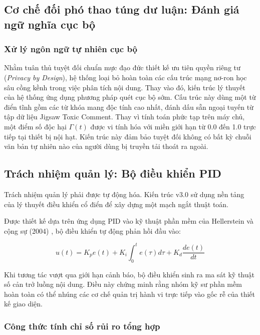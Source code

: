 \subsection{Cơ chế đối phó thao túng dư luận: Đánh giá ngữ nghĩa cục bộ}

\subsubsection{Xử lý ngôn ngữ tự nhiên cục bộ}

Nhằm tuân thủ tuyệt đối chuẩn mực đạo đức thiết kế ưu tiên quyền riêng tư (\textit{Privacy by Design}), hệ thống loại bỏ hoàn toàn các cấu trúc mạng nơ-ron học sâu cồng kềnh trong việc phân tích nội dung. Thay vào đó, kiến trúc lý thuyết của hệ thống ứng dụng phương pháp quét cục bộ sớm. Cấu trúc này dùng một từ điển tĩnh gồm các từ khóa mang độc tính cao nhất, đánh dấu sẵn ngoại tuyến từ tập dữ liệu Jigsaw Toxic Comment. Thay vì tính toán phức tạp trên máy chủ, một điểm số độc hại $\Gamma(t)$ được vi tính hóa với miền giới hạn từ 0.0 đến 1.0 trực tiếp tại thiết bị nội hạt. Kiến trúc này đảm bảo tuyệt đối không có bất kỳ chuỗi văn bản tự nhiên nào của người dùng bị truyền tải thoát ra ngoài.

\subsection{Trách nhiệm quản lý: Bộ điều khiển PID}

Trách nhiệm quản lý phải được tự động hóa. Kiến trúc v3.0 sử dụng nền tảng của lý thuyết điều khiển cổ điển để xây dựng một mạch ngắt thuật toán.

Được thiết kế dựa trên ứng dụng PID vào kỹ thuật phần mềm của Hellerstein và cộng sự (2004) \cite{hellerstein2004feedback}, bộ điều khiển tự động phản hồi đầu vào:

\begin{equation}
    u(t) = K_p e(t) + K_i \int_{0}^{t} e(\tau)d\tau + K_d \frac{de(t)}{dt}
    \label{eq:pid}
\end{equation}

Khi tương tác vượt qua giới hạn cảnh báo, bộ điều khiển sinh ra ma sát kỹ thuật số cản trở luồng nội dung. Điều này chứng minh rằng nhóm kỹ sư phần mềm hoàn toàn có thể nhúng các cơ chế quản trị hành vi trực tiếp vào gốc rễ của thiết kế giao diện.

\subsubsection{Công thức tính chỉ số rủi ro tổng hợp}

